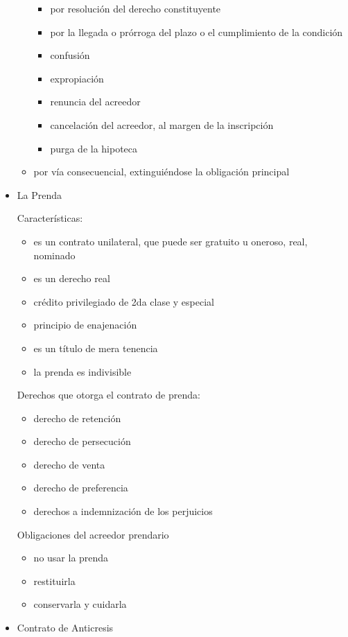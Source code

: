 \documentclass[]{article}
\providecommand{\tightlist}{%
  \setlength{\itemsep}{0pt}\setlength{\parskip}{0pt}}
\begin{document}
\begin{itemize}
\begin{itemize}
    \begin{itemize}
    \tightlist
    \item
      por resolución del derecho constituyente
    \item
      por la llegada o prórroga del plazo o el cumplimiento de la
      condición
    \item
      confusión
    \item
      expropiación
    \item
      renuncia del acreedor
    \item
      cancelación del acreedor, al margen de la inscripción
    \item
      purga de la hipoteca
    \end{itemize}
  \item
    por vía consecuencial, extinguiéndose la obligación principal
  \end{itemize}
\item
  La Prenda

  Características:

  \begin{itemize}
  \tightlist
  \item
    es un contrato unilateral, que puede ser gratuito u oneroso, real,
    nominado
  \item
    es un derecho real
  \item
    crédito privilegiado de 2da clase y especial
  \item
    principio de enajenación
  \item
    es un título de mera tenencia
  \item
    la prenda es indivisible
  \end{itemize}

  Derechos que otorga el contrato de prenda:

  \begin{itemize}
  \tightlist
  \item
    derecho de retención
  \item
    derecho de persecución
  \item
    derecho de venta
  \item
    derecho de preferencia
  \item
    derechos a indemnización de los perjuicios
  \end{itemize}

  Obligaciones del acreedor prendario

  \begin{itemize}
  \tightlist
  \item
    no usar la prenda
  \item
    restituirla
  \item
    conservarla y cuidarla
  \end{itemize}
\item
  Contrato de Anticresis


\end{itemize}
\end{document}
